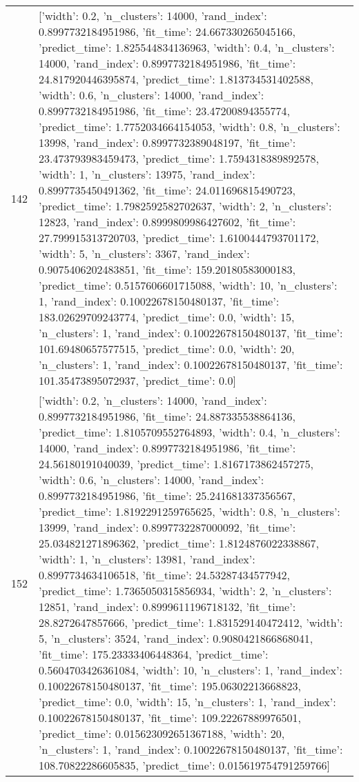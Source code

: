 \begin{tabular}{rl}
142 & [{'width': 0.2, 'n_clusters': 14000, 'rand_index': 0.8997732184951986, 'fit_time': 24.667330265045166, 'predict_time': 1.825544834136963}, {'width': 0.4, 'n_clusters': 14000, 'rand_index': 0.8997732184951986, 'fit_time': 24.817920446395874, 'predict_time': 1.813734531402588}, {'width': 0.6, 'n_clusters': 14000, 'rand_index': 0.8997732184951986, 'fit_time': 23.47200894355774, 'predict_time': 1.7752034664154053}, {'width': 0.8, 'n_clusters': 13998, 'rand_index': 0.8997732389048197, 'fit_time': 23.473793983459473, 'predict_time': 1.7594318389892578}, {'width': 1, 'n_clusters': 13975, 'rand_index': 0.8997735450491362, 'fit_time': 24.011696815490723, 'predict_time': 1.7982592582702637}, {'width': 2, 'n_clusters': 12823, 'rand_index': 0.8999809986427602, 'fit_time': 27.799915313720703, 'predict_time': 1.6100444793701172}, {'width': 5, 'n_clusters': 3367, 'rand_index': 0.9075406202483851, 'fit_time': 159.20180583000183, 'predict_time': 0.5157606601715088}, {'width': 10, 'n_clusters': 1, 'rand_index': 0.10022678150480137, 'fit_time': 183.02629709243774, 'predict_time': 0.0}, {'width': 15, 'n_clusters': 1, 'rand_index': 0.10022678150480137, 'fit_time': 101.69480657577515, 'predict_time': 0.0}, {'width': 20, 'n_clusters': 1, 'rand_index': 0.10022678150480137, 'fit_time': 101.35473895072937, 'predict_time': 0.0}] \\
152 & [{'width': 0.2, 'n_clusters': 14000, 'rand_index': 0.8997732184951986, 'fit_time': 24.887335538864136, 'predict_time': 1.8105709552764893}, {'width': 0.4, 'n_clusters': 14000, 'rand_index': 0.8997732184951986, 'fit_time': 24.56180191040039, 'predict_time': 1.8167173862457275}, {'width': 0.6, 'n_clusters': 14000, 'rand_index': 0.8997732184951986, 'fit_time': 25.241681337356567, 'predict_time': 1.8192291259765625}, {'width': 0.8, 'n_clusters': 13999, 'rand_index': 0.8997732287000092, 'fit_time': 25.034821271896362, 'predict_time': 1.8124876022338867}, {'width': 1, 'n_clusters': 13981, 'rand_index': 0.8997734634106518, 'fit_time': 24.53287434577942, 'predict_time': 1.7365050315856934}, {'width': 2, 'n_clusters': 12851, 'rand_index': 0.8999611196718132, 'fit_time': 28.8272647857666, 'predict_time': 1.831529140472412}, {'width': 5, 'n_clusters': 3524, 'rand_index': 0.9080421866868041, 'fit_time': 175.23333406448364, 'predict_time': 0.5604703426361084}, {'width': 10, 'n_clusters': 1, 'rand_index': 0.10022678150480137, 'fit_time': 195.06302213668823, 'predict_time': 0.0}, {'width': 15, 'n_clusters': 1, 'rand_index': 0.10022678150480137, 'fit_time': 109.22267889976501, 'predict_time': 0.015623092651367188}, {'width': 20, 'n_clusters': 1, 'rand_index': 0.10022678150480137, 'fit_time': 108.70822286605835, 'predict_time': 0.015619754791259766}] \\

\end{tabular}
